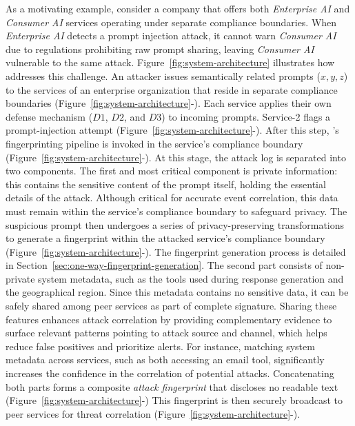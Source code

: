  As a motivating example, consider a company that offers both \emph{Enterprise AI} and \emph{Consumer AI} services operating under separate compliance boundaries.
When \emph{Enterprise AI} detects a prompt injection attack, it cannot warn \emph{Consumer AI} due to regulations prohibiting raw prompt sharing, leaving \emph{Consumer AI} vulnerable to the same attack. 
Figure~\ref{fig:system-architecture} illustrates how \tool addresses this challenge.
An attacker issues semantically related prompts ($x,y,z$) to the services of an enterprise organization that reside in separate compliance boundaries (Figure~\ref{fig:system-architecture}-).
Each service applies their own defense mechanism ($D1$, $D2$, and $D3$) to incoming prompts.
Service-2 flags a prompt-injection attempt (Figure~\ref{fig:system-architecture}-).
After this step, \tool's fingerprinting pipeline is invoked in the service's compliance boundary (Figure~\ref{fig:system-architecture}-).
%
At this stage, the attack log is separated into two components.
The first and most critical component is private information: this contains the sensitive content of the prompt itself, holding the essential details of the attack.
Although critical for accurate event correlation, this data must remain within the service’s compliance boundary to safeguard privacy.
The suspicious prompt then undergoes a series of privacy-preserving transformations to generate a fingerprint within the attacked service's compliance boundary (Figure~\ref{fig:system-architecture}-).
The fingerprint generation process is detailed in Section~\ref{sec:one-way-fingerprint-generation}.
%
The second part consists of non-private system metadata, such as the tools used during response generation and the geographical region.
Since this metadata contains no sensitive data, it can be safely shared among peer services as part of complete signature.
Sharing these features enhances attack correlation by providing complementary evidence to surface relevant patterns pointing to attack source and channel, which helps reduce false positives and prioritize alerts.
For instance, matching system metadata across services, such as both accessing an email tool, significantly increases the confidence in the correlation of potential attacks.
%
Concatenating both parts forms a composite \emph{attack fingerprint} that discloses no readable text (Figure~\ref{fig:system-architecture}-)
This fingerprint is then securely broadcast to peer services for threat correlation (Figure~\ref{fig:system-architecture}-).

